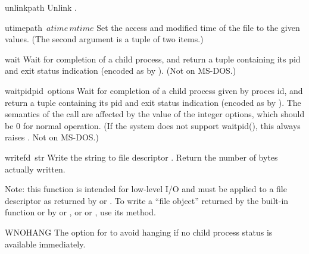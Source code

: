 \begin{funcdesc}{unlink}{path}
Unlink .
\end{funcdesc}

\begin{funcdesc}{utime}{path\, \(atime\, mtime\)}
Set the access and modified time of the file to the given values.
(The second argument is a tuple of two items.)
\end{funcdesc}

\begin{funcdesc}{wait}{}
Wait for completion of a child process, and return a tuple containing
its pid and exit status indication (encoded as by \UNIX{}).
(Not on MS-DOS.)
\end{funcdesc}

\begin{funcdesc}{waitpid}{pid\, options}
Wait for completion of a child process given by proces id, and return
a tuple containing its pid and exit status indication (encoded as by
\UNIX{}).  The semantics of the call are affected by the value of
the integer options, which should be 0 for normal operation.  (If the
system does not support waitpid(), this always raises
.  Not on MS-DOS.)
\end{funcdesc}

\begin{funcdesc}{write}{fd\, str}
Write the string  to file descriptor .
Return the number of bytes actually written.

Note: this function is intended for low-level I/O and must be applied
to a file descriptor as returned by  or
.  To write a ``file object'' returned by the
built-in function  or by  or
, or  or , use
its  method.
\end{funcdesc}

\begin{datadesc}{WNOHANG}
The option for  to avoid hanging if no child process
status is available immediately.
\end{datadesc}

